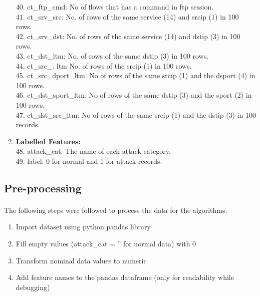 \documentclass[a4paper,12pt]{article}
\begin{document}
\begin{enumerate}
                    40. ct\_ftp\_cmd: No of flows that has a command in ftp session. \\
                    41. ct\_srv\_src: No. of rows of the same service (14) and srcip (1) in 100 rows. \\
                    42. ct\_srv\_dst: No. of rows of the same service (14) and dstip (3) in 100 rows. \\
                    43. ct\_dst\_ltm: No. of rows of the same dstip (3) in 100 rows. \\
                    44. ct\_src\_: ltm No. of rows of the srcip (1) in 100 rows. \\
                    45. ct\_src\_dport\_ltm: No of rows of the same srcip (1) and the dsport (4) in 100 rows. \\
                    46. ct\_dst\_sport\_ltm: No of rows of the same dstip (3) and the sport (2) in 100 rows. \\
                    47. ct\_dst\_src\_ltm: No of rows of the same srcip (1) and the dstip (3) in 100 records.
                \item \textbf{Labelled Features:} \\
                    48. attack\_cat: The name of each attack category. \\
                    49. label: 0 for normal and 1 for attack records.
            \end{enumerate}

        \subsection{Pre-processing}
        \paragraph{}
        The following steps were followed to process the data for the algorithms:
        \begin{enumerate}
            \item Import dataset using python pandas library
            \item Fill empty values (attack\_cat = '' for normal data) with 0
            \item Transform nominal data values to numeric
            \item Add feature names to the pandas dataframe (only for readability while debugging)
        \end{enumerate}
\end{document}
